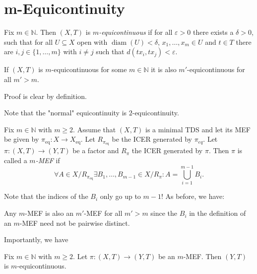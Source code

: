 \section{m-Equicontinuity}

\begin{frame}
    \begin{definition}[$m$-Equicontinuity]
	    Fix $m \in \mathbb{N}$. Then $(X, T)$ is \emph{$m$-equicontinuous} if for all $\varepsilon > 0$ there exists a $\delta > 0$, such that for all $U \subseteq X$ open with $\operatorname{diam}(U) < \delta$, $x_1, \dots, x_m \in U$ and $t \in T$ there are $i, j \in \{1, \dots, m\}$ with $i \neq j$ such that $d(tx_i, tx_j) < \varepsilon$.
    \end{definition}
    \pause
    \begin{proposition}
	    If $(X, T)$ is $m$-equicontinuous for some $m \in \mathbb{N}$ it is also $m'$-equicontinuous for all $m' > m$.
    \end{proposition}
    Proof is clear by definition.

    Note that the "normal" equicontinuity is $2$-equicontinuity.
\end{frame}

\begin{frame}
    \begin{definition}[$m$-MEF]
        Fix $m \in \mathbb{N}$ with $m \geq 2$. Assume that $(X, T)$ is a minimal TDS and let its MEF be given by $\pi_{\mathrm{eq}}: X \to X_{\mathrm{eq}}$. Let $R_{\pi_{\mathrm{eq}}}$ be the ICER generated by $\pi_{eq}$. Let $\pi: (X,T) \to (Y,T)$ be a factor and $R_\pi$ the ICER generated by $\pi$.
        Then $\pi$ is called a \emph{$m$-MEF} if
        \begin{equation*}
            \forall A \in X/R_{\pi_{\mathrm{eq}}} \exists B_1, \dots, B_{m-1} \in X/R_\pi: 
            A = \bigcup_{i=1}^{m-1} B_i.
        \end{equation*}
    \end{definition}
    Note that the indices of the $B_i$ only go up to $m-1$!
    \pause
    As before, we have:
    \begin{remark}
        Any $m$-MEF is also an $m'$-MEF for all $m' > m$
        since the $B_i$ in the definition of an $m$-MEF need not be pairwise distinct.
    \end{remark}
\end{frame}

\begin{frame}
    Importantly, we have
    \begin{proposition}
	    Fix $m \in \mathbb{N}$ with $m \geq 2$. Let $\pi : (X,T) \to (Y, T)$ be an $m$-MEF. Then $(Y, T)$ is $m$-equicontinuous.
    \end{proposition}
\end{frame}

